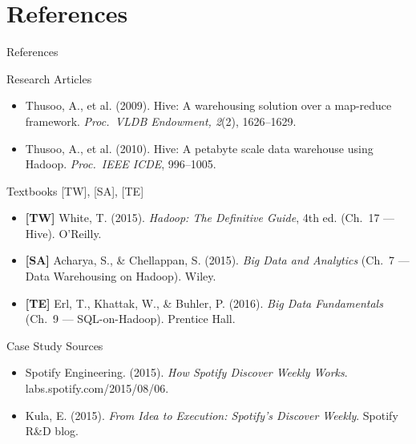 \documentclass[aspectratio=169,10pt]{beamer}
\begin{document}
\section*{References}

\begin{frame}{References}
  \begin{block}{Research Articles}
    \begin{itemize}
      \item Thusoo, A., et al. (2009).
            Hive: A warehousing solution over a map-reduce framework.
            \textit{Proc.\ VLDB Endowment, 2}(2), 1626--1629.
      \item Thusoo, A., et al. (2010).
            Hive: A petabyte scale data warehouse using Hadoop.
            \textit{Proc.\ IEEE ICDE}, 996--1005.
    \end{itemize}
  \end{block}
  \vspace{4pt}
  \begin{block}{Textbooks \textmd{[TW], [SA], [TE]}}
    \begin{itemize}
      \item \textbf{[TW]} White, T. (2015).
            \textit{Hadoop: The Definitive Guide}, 4th ed.
            (Ch.~17 — Hive). O'Reilly.
      \item \textbf{[SA]} Acharya, S., \& Chellappan, S. (2015).
            \textit{Big Data and Analytics}
            (Ch.~7 — Data Warehousing on Hadoop). Wiley.
      \item \textbf{[TE]} Erl, T., Khattak, W., \& Buhler, P. (2016).
            \textit{Big Data Fundamentals}
            (Ch.~9 — SQL-on-Hadoop). Prentice Hall.
    \end{itemize}
  \end{block}
  \vspace{4pt}
  \begin{block}{Case Study Sources}
    \begin{itemize}
      \item Spotify Engineering. (2015).
            \textit{How Spotify Discover Weekly Works}.
            labs.spotify.com/2015/08/06.
      \item Kula, E. (2015).
            \textit{From Idea to Execution: Spotify's Discover Weekly}.
            Spotify R\&D blog.
    \end{itemize}
  \end{block}
\end{frame}
\end{document}
